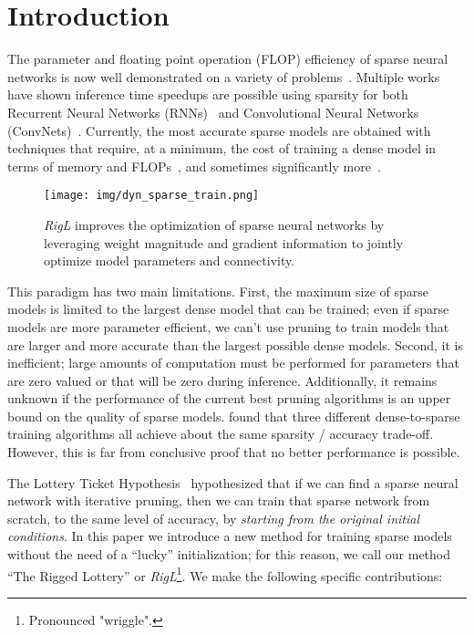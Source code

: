 \documentclass{article}
\begin{document}
\section{Introduction}
\label{sec:intro}
The parameter and floating point operation (FLOP) efficiency of sparse neural networks is now well demonstrated on a variety of problems~\citep{han2015learning, pruning_spike_slab_prior}.  Multiple works have shown inference time speedups are possible using sparsity for both Recurrent Neural Networks (RNNs)~\citep{kalchbrenner2018} and Convolutional Neural Networks (ConvNets)~\citep{SparseCNN_Intel_Park16, elsen2019fast}.  Currently, the most accurate sparse models are obtained with techniques that require, at a minimum, the cost of training a dense model in terms of memory and FLOPs~\citep{gupta2018, DynamicSurgery}, and sometimes significantly more~\citep{variational-dropout}.

\begin{figure}
\centering
\texttt{[image: img/dyn\_sparse\_train.png]}
\caption{\textit{RigL} improves the optimization of sparse neural networks by leveraging weight magnitude and gradient information to jointly optimize model parameters and connectivity.}
\label{fig:strain}
\end{figure}

This paradigm has two main limitations.  First, the maximum size of sparse models is limited to the largest dense model that can be trained;  even if sparse models are more parameter efficient, we can't use pruning to train models that are larger and more accurate than the largest possible dense models.  Second, it is inefficient; large amounts of computation must be performed for parameters that are zero valued or that will be zero during inference. Additionally, it remains unknown if the performance of the current best pruning algorithms is an upper bound on the quality of sparse models.  \citet{gale2019state} found that three different dense-to-sparse training algorithms all achieve about the same sparsity / accuracy trade-off. However, this is far from conclusive proof that no better performance is possible.



The Lottery Ticket Hypothesis~\citep{frankle2018} hypothesized that if we can find a sparse neural network with iterative pruning, then we can train that sparse network from scratch, to the same level of accuracy, by {\em starting from the original initial conditions}. In this paper we introduce a new method for training sparse models without the need of a ``lucky'' initialization; for this reason, we call our method ``The Rigged Lottery'' or \textit{RigL}\footnote{Pronounced "wriggle".}. We make the following specific contributions:
\end{document}
